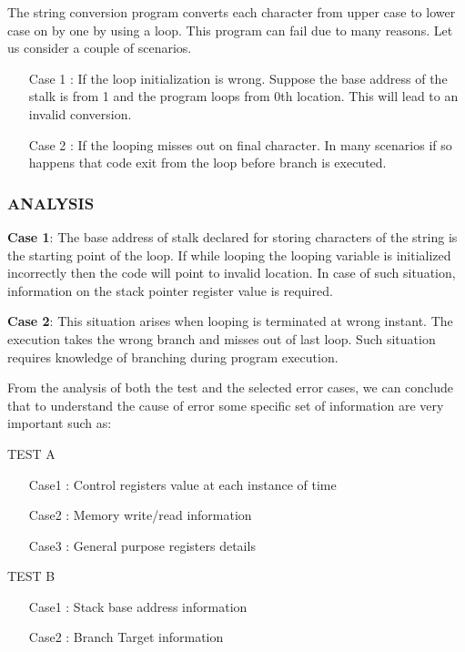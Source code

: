 \vspace{2cm}

The string conversion program converts each character from upper case to lower case on by one by using a loop. This program can fail due to many reasons. Let us consider a couple of scenarios.

\begin{itemize}

\item [Case 1]: If the loop initialization is wrong. Suppose the base address of the stalk is from 1 and the program loops from 0th location. This will lead to an invalid conversion.

\item [Case 2]: If the looping misses out on final character. In many scenarios if so happens that code exit from the loop before branch is executed.
\end{itemize}
\subsubsection{ANALYSIS}

{\bf Case 1}: The base address of stalk declared for storing characters of the string is the starting point of the loop. If while looping the looping variable is initialized incorrectly then the code will point to invalid location.  In case of such situation, information on the stack pointer register value is required.

{\bf Case 2}:  This situation arises when looping is terminated at wrong instant. The execution takes the wrong branch and misses out of last loop. Such situation requires knowledge of branching during program execution.

From the analysis of both the test and the selected error cases, we can conclude that to understand the cause of error some specific set of information are very important such as:

TEST A 
	\begin{itemize}
	\item [Case1]:  Control registers value at each instance of time
	\item [Case2]:  Memory write/read information
	\item [Case3]:  General purpose registers details
	\end{itemize}
TEST B 
	\begin{itemize}
	\item [Case1]: Stack base address information
	\item [Case2]: Branch Target information
	\end{itemize}

